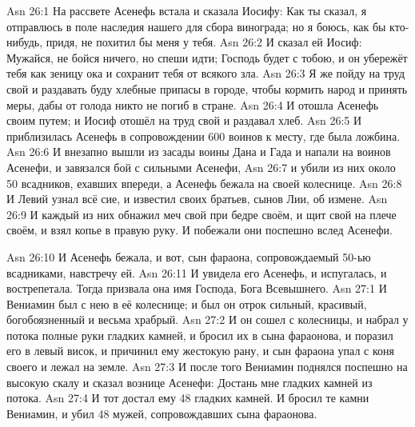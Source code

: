 \vs Asn 26:1
На рассвете Асенефь встала и
сказала Иосифу: Как ты сказал, я отправлюсь в поле наследия нашего для сбора
винограда; но я боюсь, как бы кто-нибудь, придя, не похитил бы меня у тебя.
\vs Asn 26:2
И сказал ей Иосиф: Мужайся,
не бойся ничего, но спеши идти; Господь будет с тобою, и он убережёт тебя как
зеницу ока и сохранит тебя от всякого зла.
\vs Asn 26:3
Я же пойду на труд свой и
раздавать буду хлебные припасы в городе, чтобы кормить народ и принять меры,
дабы от голода никто не погиб в стране.
\vs Asn 26:4
И отошла Асенефь своим путем;
и Иосиф отошёл на труд свой и раздавал хлеб.
\vs Asn 26:5
И приблизилась Асенефь в
сопровождении 600 воинов к месту, где была ложбина.
\vs Asn 26:6
И внезапно вышли из засады воины Дана и Гада
и напали на воинов Асенефи, и завязался бой с сильными Асенефи,
\vs Asn 26:7
и убили из них около 50 всадников,
ехавших впереди, а Асенефь бежала на своей колеснице.
\vs Asn 26:8
И Левий узнал всё сие, и
известил своих братьев, сынов Лии, об измене.
\vs Asn 26:9
И каждый из них обнажил меч
свой при бедре своём, и щит свой на плече своём, и взял копье в правую руку. И
побежали они поспешно вслед Асенефи.

\vs Asn 26:10
И Асенефь бежала, и вот, сын фараона, сопровождаемый
50-ью всадниками, навстречу ей.
\vs Asn 26:11
И увидела его Асенефь, и испугалась, и вострепетала. Тогда
призвала она имя Господа, Бога Всевышнего.
\vs Asn 27:1
И Вениамин был с нею в её колеснице; и был он отрок сильный,
красивый, богобоязненный и весьма храбрый.
\vs Asn 27:2
И он сошел с колесницы, и
набрал у потока полные руки гладких камней, и бросил их в сына фараонова, и
поразил его в левый висок, и причинил ему жестокую рану, и сын фараона упал с
коня своего и лежал на земле.
\vs Asn 27:3
И после того Вениамин
поднялся поспешно на высокую скалу и сказал вознице Асенефи: Достань мне
гладких камней из потока.
\vs Asn 27:4
И тот достал ему 48 гладких камней.
И бросил те камни Вениамин, и убил 48 мужей,
сопровождавших сына фараонова.

